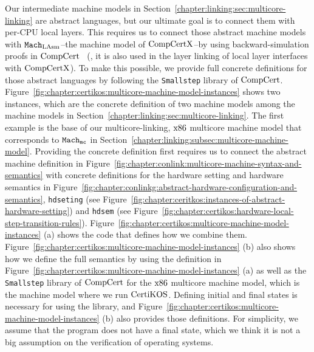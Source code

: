 Our intermediate machine models in Section~\ref{chapter:linking:sec:multicore-linking} are abstract languages, but our ultimate goal is to connect them with per-CPU local layers. 
This requires us to connect those abstract machine models with ${\mathrm{\texttt{Mach}}}_{\mathrm{LAsm}}$--the machine model of $\mathrm{CompCertX}$--by using backward-simulation proofs in $\mathrm{CompCert}$~\cite{leroy06} (\ie, it is also used in the layer linking of local layer interfaces  with $\mathrm{CompCertX}$).
To make  this possible,
we provide  full concrete definitions for those abstract languages
by following the \lstinline$Smallstep$ library of $\mathrm{CompCert}$.
Figure~\ref{fig:chapter:certikos:multicore-machine-model-instances}
shows two instances, which are the concrete definition 
of two machine models among the machine models in Section~\ref{chapter:linking:sec:multicore-linking}.
The first example is the base of our multicore-linking, $\mathrm{x86}$ multicore machine model that corresponds to ${{{{\mathrm{\texttt{Mach}}}}_{\mathrm{\texttt{mc}}}}}$ in Section~\ref{chapter:linking:subsec:multicore-machine-model}.
Providing the concrete definition first requires 
us to connect the abstract machine definition in Figure~\ref{fig:chapter:conlink:multicore-machine-syntax-and-semantics}
with concrete definitions for the hardware setting and  hardware semantics in Figure~\ref{fig:chapter:conlinkg:abstract-hardware-configuration-and-semantics}, \lstinline$hdseting$ (see Figure~\ref{fig:chapter:ceritkos:instances-of-abstract-hardware-setting}) and \lstinline$hdsem$ (see Figure~\ref{fig:chapter:certikos:hardware-local-step-transition-rules}). 
Figure~\ref{fig:chapter:certikos:multicore-machine-model-instances} (a) shows 
the code that defines how we combine them.
Figure~\ref{fig:chapter:certikos:multicore-machine-model-instances} (b) 
also shows how we define the full semantics by using the  definition in Figure~\ref{fig:chapter:certikos:multicore-machine-model-instances} (a) as well as the \lstinline$Smallstep$ library of $\mathrm{CompCert}$  for the $\mathrm{x86}$ multicore machine model, which is the machine model 
where we run $\mathrm{CertiKOS}$. 
Defining initial and final states is necessary for using the library, and Figure~\ref{fig:chapter:certikos:multicore-machine-model-instances} (b)  also provides those definitions.
For simplicity, we assume that the program does not have a final state, which we think it is not a big assumption 
on the verification of operating systems.

